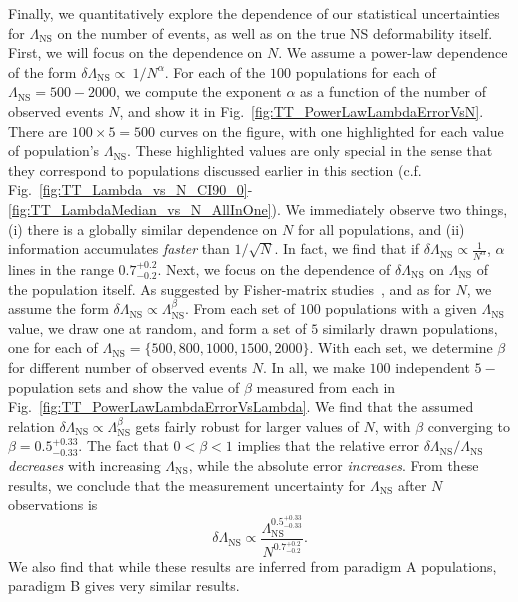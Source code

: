 \documentclass[aps,prd,amsmath,floats,floatfix, twocolumn,
superscriptaddress,nofootinbib,showpacs]{revtex4-1}
\newcommand{\lambdans}{\Lambda_\mathrm{NS}}
\begin{document}
Finally, we quantitatively explore the dependence of our statistical
uncertainties for $\lambdans$ on the number of events, as well as on the true
NS deformability itself. First, we will focus on the dependence on $N$. We
assume a power-law dependence of the form
$\delta\lambdans\propto\ 1/N^\alpha$. For each of the $100$ populations 
for each of $\lambdans=500-2000$, we compute the exponent $\alpha$ as a
function of the number of observed events $N$, and show it in 
Fig.~\ref{fig:TT_PowerLawLambdaErrorVsN}. There are $100\times5=500$ curves
on the figure, with one highlighted for each value of population's $\lambdans$.
These highlighted values are only special in the sense that they correspond to
populations discussed earlier in this section (c.f.
Fig.~\ref{fig:TT_Lambda_vs_N_CI90_0}-\ref{fig:TT_LambdaMedian_vs_N_AllInOne}).
We immediately observe two things, (i) there is a globally similar dependence
on $N$ for all populations, and (ii) information accumulates {\it faster} than
$1/\sqrt{N}$. In fact, we find that if
$\delta\lambdans\propto\frac{1}{N^\alpha}$, $\alpha$ lines in the range
$0.7_{-0.2}^{+0.2}$.
% 
Next, we focus on the dependence of $\delta\lambdans$ on $\lambdans$ of the
population itself. As suggested by Fisher-matrix studies~\cite{Lackey:2013axa},
and as for $N$, we assume the form $\delta\lambdans\propto\lambdans^\beta$.
From each set of $100$ populations with a given $\lambdans$ value, we draw one
at random, and form a set of $5$ similarly drawn populations, one for each of
$\lambdans=\{500,800,1000,1500,2000\}$. With each set, we determine $\beta$
for different number of observed events $N$. In all, we make $100$ independent
$5-$population sets and show the value of $\beta$ measured from each in 
Fig.~\ref{fig:TT_PowerLawLambdaErrorVsLambda}. We find that the assumed
relation $\delta\lambdans\propto\lambdans^\beta$ gets fairly robust for 
larger values of $N$, with $\beta$ converging to $\beta=0.5^{+0.33}_{-0.33}$.
The fact that $0<\beta<1$ implies that the relative error
$\delta\lambdans/\lambdans$ {\it decreases} with increasing $\lambdans$, while
the absolute error {\it increases}.
% 
From these results, we conclude that the measurement uncertainty for
$\lambdans$ after $N$ observations is
\begin{equation}
 \delta\lambdans\propto \dfrac{\lambdans^{0.5^{+0.33}_{-0.33}}}{N^{0.7_{-0.2}^{+0.2}}}.
\end{equation}
We also find that while these results are inferred from paradigm A populations,
paradigm B gives very similar results.
\end{document}
